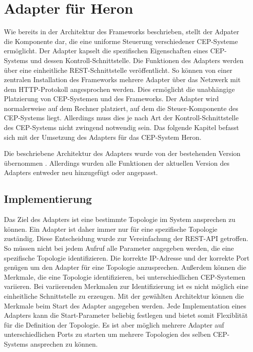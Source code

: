 \chapter{Adapter für Heron}

Wie bereits in der Architektur des Frameworks beschrieben, stellt der Adpater die Komponente dar, die eine uniforme Steuerung verschiedener CEP-Systeme ermöglicht.
Der Adapter kapselt die spezifischen Eigenschaften eines CEP-Systems und dessen Kontroll-Schnittstelle.
Die Funktionen des Adapters werden über eine einheitliche REST-Schnittstelle veröffentlicht.
So können von einer zentralen Installation des Frameworks mehrere Adapter über das Netzwerk mit dem HTTP-Protokoll angesprochen werden.
Dies ermöglicht die unabhängige Platzierung von CEP-Systemen und des Frameworks.
Der Adapter wird normalerweise auf dem Rechner platziert, auf dem die Steuer-Komponente des CEP-Systems liegt.
Allerdings muss dies je nach Art der Kontroll-Schnittstelle des CEP-Systems nicht zwingend notwendig sein.
Das folgende Kapitel befasst sich mit der Umsetzung des Adapters für das CEP-System Heron.

Die beschriebene Architektur des Adapters wurde von der bestehenden Version übernommen \cite{goggel_vergleich_2018}.
Allerdings wurden alle Funktionen der aktuellen Version des Adapters entweder neu hinzugefügt oder angepasst.

\section{Implementierung}

Das Ziel des Adapters ist eine bestimmte Topologie im System ansprechen zu können.
Ein Adapter ist daher immer nur für eine spezifische Topologie zuständig.
Diese Entscheidung wurde zur Vereinfachung der REST-API getroffen.
So müssen nicht bei jedem Aufruf alle Parameter angegeben werden, die eine spezifische Topologie identifizieren.
Die korrekte IP-Adresse und der korrekte Port genügen um den Adapter für eine Topologie anzusprechen.
Außerdem können die Merkmale, die eine Topologie identifizieren, bei unterschiedlichen CEP-Systemen variieren.
Bei variierenden Merkmalen zur Identifizierung ist es nicht möglich eine einheitliche Schnittstelle zu erzeugen.
Mit der gewählten Architektur können die Merkmale beim Start des Adapter angegeben werden.
Jede Implementation eines Adapters kann die Start-Parameter beliebig festlegen und bietet somit Flexiblität für die Definition der Topologie.
Es ist aber möglich mehrere Adapter auf unterschiedlichen Ports zu starten um mehrere Topologien des selben CEP-Systems ansprechen zu können.

